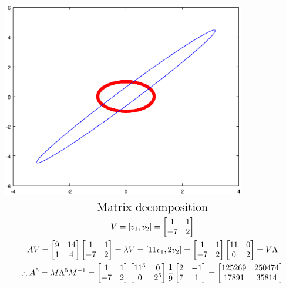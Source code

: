 \documentclass[12pt,a4paper]{article}
\begin{document}
\includegraphics[width=0.8\textwidth]{5.eps}
\begin{gather*}
\text{\Large Matrix decomposition}\\
V = [v_1, v_2]=
\begin{bmatrix}
1&1\\-7&2
\end{bmatrix}\\
AV = 
\begin{bmatrix}
9&14\\1&4
\end{bmatrix}
\begin{bmatrix}
1&1\\-7&2
\end{bmatrix}=\lambda V = 
[11v_1, 2v_2]=
\begin{bmatrix}
1&1\\-7&2
\end{bmatrix}
\begin{bmatrix}
11&0\\0&2
\end{bmatrix}
=V\Lambda\\
\therefore A^5=M\Lambda^5M^{-1}=
\begin{bmatrix}
1&1\\-7&2
\end{bmatrix}
\begin{bmatrix}
11^5&0\\0&2^5
\end{bmatrix}
\dfrac{1}{9}
\begin{bmatrix}
2&-1\\7&1
\end{bmatrix}=
\begin{bmatrix}
 125269 &  250474\\
 17891   & 35814
\end{bmatrix}
\end{gather*}
\end{document}
